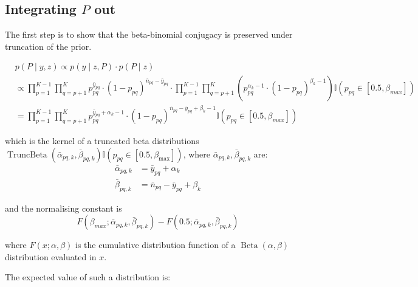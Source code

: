 \documentclass[11pt]{amsart}
\begin{document}
\subsection{Integrating $P$ out}

The first step is to show that the beta-binomial conjugacy is preserved under truncation of the prior.

\begin{align}
&p \left(P \mid y, z \right) \propto  p\left(y \mid z, P\right) \cdot p(P \mid z) \\
& \propto \prod_{p=1}^{K-1} \prod_{q=p+1}^K p_{pq}^{\bar{y}_{pq}} \cdot (1 - p_{pq})^{\bar{n}_{pq}- \bar{y}_{pq}} 
\cdot \prod_{p=1}^{K-1}\prod_{q= p+1}^{K} \left( p_{pq}^{\alpha_k-1} \cdot (1 - p_{pq})^{\beta_k -1} \right) \mathbb{I}\left(p_{pq} \in \left[0.5,\beta_{max}\right] \right) \\
& =  \prod_{p=1}^{K-1}\prod_{q= p+1}^{K} p_{pq}^{\bar{y}_{pq}+\alpha_k-1} \cdot\left(1-p_{pq}\right)^{\bar{n}_{pq}-\bar{y}_{pq}+\beta_k -1} \mathbb{I}\left(p_{pq} \in \left[0.5,\beta_{max}\right] \right)\label{eq_integratingPout_integral}
\end{align}

which is the kernel of a truncated beta distributions $\operatorname{TruncBeta}\left(\bar{\alpha}_{pq,k},\bar{\beta}_{pq,k}\right)\mathbb{I}\left(p_{pq} \in \left[0.5,\beta_{\max}\right] \right)$, where $\bar{\alpha}_{pq,k},\bar{\beta}_{pq,k}$ are:
\begin{align}
\bar{\alpha}_{pq,k} &= \bar{y}_{pq}+\alpha_k \label{eq_alpha_k} \\
\bar{\beta}_{pq,k} &= \bar{n}_{pq}-\bar{y}_{pq}+\beta_k \label{eq_beta_k}
\end{align}

and the normalising constant is
\begin{equation}
F(\beta_{max};\bar{\alpha}_{pq,k},\bar{\beta}_{pq,k}) - F(0.5;\bar{\alpha}_{pq,k},\bar{\beta}_{pq,k}) 
\label{eq_normalising_constant}
\end{equation}
    
where $F(x;\alpha,\beta)$ is the cumulative distribution function of a $\operatorname{Beta}\left(\alpha,\beta\right)$ distribution evaluated in $x$.

The expected value of such a distribution is:
\end{document}
